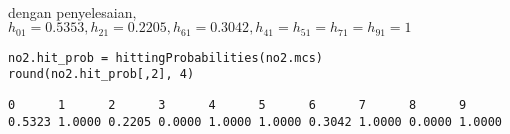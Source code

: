 \documentclass[answers]{exam}
\begin{document}
\begin{questions}
\begin{parts}
\begin{solution}
\begin{align*}
                \end{align*}
                dengan penyelesaian, $h_{01} = 0.5353, h_{21} = 0.2205, h_{61} = 0.3042, h_{41} = h_{51} = h_{71} = h_{91} = 1$
                \end{solution}
                \begin{minipage}[t]{.9\textwidth}
                    \begin{lstlisting}[title=Code]
no2.hit_prob = hittingProbabilities(no2.mcs)
round(no2.hit_prob[,2], 4)  
                    \end{lstlisting}
                \end{minipage}
                \newline
                \begin{minipage}[t]{.9\textwidth}
                    \begin{lstlisting}[title=Output]
     0      1      2      3      4      5      6      7      8      9 
0.5323 1.0000 0.2205 0.0000 1.0000 1.0000 0.3042 1.0000 0.0000 1.0000 
                    \end{lstlisting}
                \end{minipage}

                

\end{parts}
\end{questions}
\end{document}
